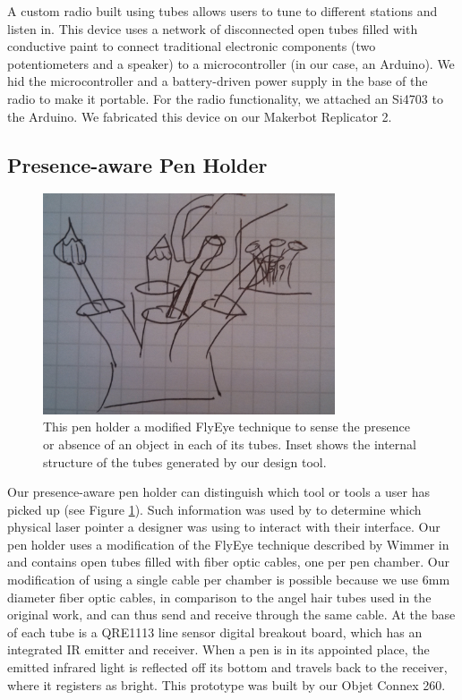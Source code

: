 A custom radio built using tubes allows users to tune to different stations and listen in.  This device uses a network of disconnected open tubes filled with conductive paint to connect traditional electronic components (two potentiometers and a speaker) to a microcontroller (in our case, an Arduino).  We hid the microcontroller and a battery-driven power supply in the base of the radio to make it portable.  For the radio functionality, we attached an Si4703 to the Arduino.  We fabricated this device on our Makerbot Replicator 2.

\subsection{Presence-aware Pen Holder}

\begin{figure}[h]
\centering
    \includegraphics[width=3.4in]{figures/placeholder/pens.jpg}
\caption{This pen holder a modified FlyEye technique to sense the presence or absence of an object in each of its tubes.  Inset shows the internal structure of the tubes generated by our design tool.}
\label{fig:pens}
\end{figure}

Our presence-aware pen holder can distinguish which tool or tools a user has picked up (see Figure \ref{fig:pens}).  Such information was used by \cite{Mueller-constructable} to determine which physical laser pointer a designer was using to interact with their interface.  Our pen holder uses a modification of the FlyEye technique described by Wimmer in \cite{Wimmer-flyeye} and contains open tubes filled with fiber optic cables, one per pen chamber.  Our modification of using a single cable per chamber is possible because we use 6mm diameter fiber optic cables, in comparison to the angel hair tubes used in the original work, and can thus send and receive through the same cable.  At the base of each tube is a QRE1113 line sensor digital breakout board, which has an integrated IR emitter and receiver.   When a pen is in its appointed place, the emitted infrared light is reflected off its bottom and travels back to the receiver, where it registers as bright.  This prototype was built by our Objet Connex 260. 


